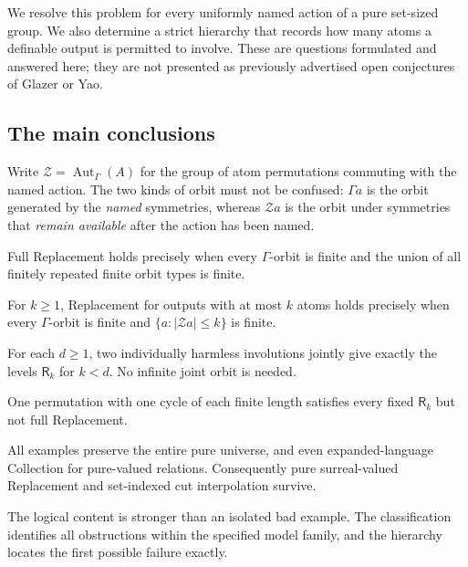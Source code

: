 \documentclass[11pt,letterpaper]{article}
\theoremstyle{definition}
\theoremstyle{remark}
\newcommand{\Aut}{\operatorname{Aut}}
\newcommand{\abs}[1]{\lvert #1\rvert}
\begin{document}
We resolve this problem for every uniformly named action of a pure set-sized group. We also determine a strict hierarchy that records how many atoms a definable output is permitted to involve. These are questions formulated and answered here; they are not presented as previously advertised open conjectures of Glazer or Yao.

\subsection{The main conclusions}
Write $\mathcal Z=\Aut_\Gamma(A)$ for the group of atom permutations commuting with the named action. The two kinds of orbit must not be confused: $\Gamma a$ is the orbit generated by the \emph{named} symmetries, whereas $\mathcal Z a$ is the orbit under symmetries that \emph{remain available} after the action has been named.

\begin{description}[style=nextline,leftmargin=0pt,labelwidth=0pt,labelsep=0pt,font=\normalfont\bfseries]
\item[Exact full criterion (\cref{hset:ns:thm:full}).]
Full Replacement holds precisely when every $\Gamma$-orbit is finite and the union of all finitely repeated finite orbit types is finite.
\item[Exact bounded-kernel criterion (\cref{hset:ns:thm:graded}).]
For $k\ge1$, Replacement for outputs with at most $k$ atoms holds precisely when every $\Gamma$-orbit is finite and $\{a:\abs{\mathcal Z a}\le k\}$ is finite.
\item[Sharp hierarchy using two involutions (\cref{hset:ns:thm:strict}).]
For each $d\ge1$, two individually harmless involutions jointly give exactly the levels $\mathsf R_k$ for $k<d$. No infinite joint orbit is needed.
\item[The limit gap (\cref{hset:ns:thm:single}).]
One permutation with one cycle of each finite length satisfies every fixed $\mathsf R_k$ but not full Replacement.
\item[Surreal invariance (\cref{hset:ns:thm:purecollection,hset:ns:cor:surreal}).]
All examples preserve the entire pure universe, and even expanded-language Collection for pure-valued relations. Consequently pure surreal-valued Replacement and set-indexed cut interpolation survive.
\end{description}

The logical content is stronger than an isolated bad example. The classification identifies all obstructions within the specified model family, and the hierarchy locates the first possible failure exactly.
\end{document}
